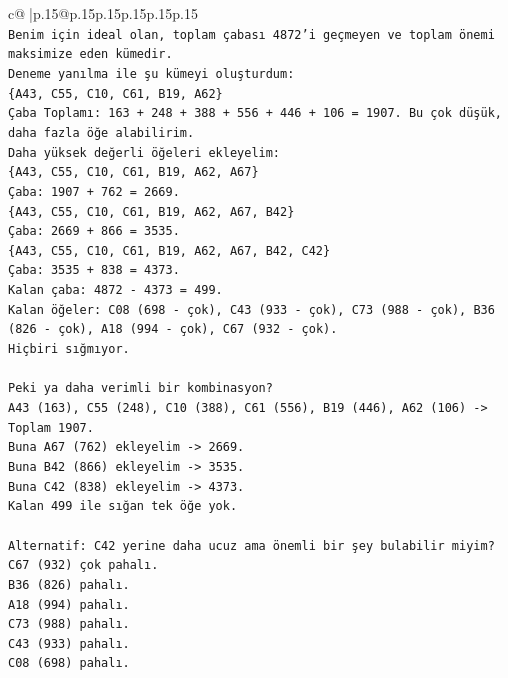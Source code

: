\documentclass{article}
\begin{document}
{\begin{supertabular}{c@{$\;$}|p{.15\linewidth}@{}p{.15\linewidth}p{.15\linewidth}p{.15\linewidth}p{.15\linewidth}p{.15\linewidth}}
{{{\\ 
\texttt{Benim için ideal olan, toplam çabası 4872'i geçmeyen ve toplam önemi maksimize eden kümedir.} \\
\texttt{Deneme yanılma ile şu kümeyi oluşturdum:} \\
\texttt{\{A43, C55, C10, C61, B19, A62\}} \\
\texttt{Çaba Toplamı: 163 + 248 + 388 + 556 + 446 + 106 = 1907. Bu çok düşük, daha fazla öğe alabilirim.} \\
\texttt{Daha yüksek değerli öğeleri ekleyelim:} \\
\texttt{\{A43, C55, C10, C61, B19, A62, A67\}} \\
\texttt{Çaba: 1907 + 762 = 2669.} \\
\texttt{\{A43, C55, C10, C61, B19, A62, A67, B42\}} \\
\texttt{Çaba: 2669 + 866 = 3535.} \\
\texttt{\{A43, C55, C10, C61, B19, A62, A67, B42, C42\}} \\
\texttt{Çaba: 3535 + 838 = 4373.} \\
\texttt{Kalan çaba: 4872 {-} 4373 = 499.} \\
\texttt{Kalan öğeler: C08 (698 {-} çok), C43 (933 {-} çok), C73 (988 {-} çok), B36 (826 {-} çok), A18 (994 {-} çok), C67 (932 {-} çok).} \\
\texttt{Hiçbiri sığmıyor.} \\
\\ 
\texttt{Peki ya daha verimli bir kombinasyon?} \\
\texttt{A43 (163), C55 (248), C10 (388), C61 (556), B19 (446), A62 (106) {-}> Toplam 1907.} \\
\texttt{Buna A67 (762) ekleyelim {-}> 2669.} \\
\texttt{Buna B42 (866) ekleyelim {-}> 3535.} \\
\texttt{Buna C42 (838) ekleyelim {-}> 4373.} \\
\texttt{Kalan 499 ile sığan tek öğe yok.} \\
\\ 
\texttt{Alternatif: C42 yerine daha ucuz ama önemli bir şey bulabilir miyim?} \\
\texttt{C67 (932) çok pahalı.} \\
\texttt{B36 (826) pahalı.} \\
\texttt{A18 (994) pahalı.} \\
\texttt{C73 (988) pahalı.} \\
\texttt{C43 (933) pahalı.} \\
\texttt{C08 (698) pahalı.} \\
}}}
\end{supertabular}}
\end{document}
